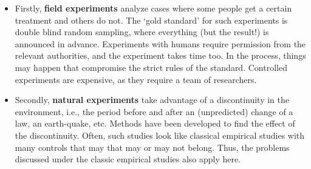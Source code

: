 \documentclass[
  12pt,
  oneside]{book}
\providecommand{\tightlist}{%
  \setlength{\itemsep}{0pt}\setlength{\parskip}{0pt}}
\theoremstyle{definition}
\theoremstyle{definition}
\theoremstyle{definition}
\theoremstyle{definition}
\theoremstyle{remark}
\begin{document}
\begin{itemize}
\tightlist
\item
  Firstly, \textbf{field experiments} analyze cases where some people get a certain treatment and others do not. The `gold standard' for such experiments is double blind random sampling, where everything (but the result!) is announced in advance. Experiments with humans require permission from the relevant authorities, and the experiment takes time too. In the process, things may happen that compromise the strict rules of the standard. Controlled experiments are expensive, as they require a team of researchers.
\item
  Secondly, \textbf{natural experiments} take advantage of a discontinuity in the environment, i.e., the period before and after an (unpredicted) change of a law, an earth-quake, etc. Methods have been developed to find the effect of the discontinuity. Often, such studies look like classical empirical studies with many controls that may that may or may not belong. Thus, the problems discussed under the classic empirical studies also apply here.
\end{itemize}
\end{document}
